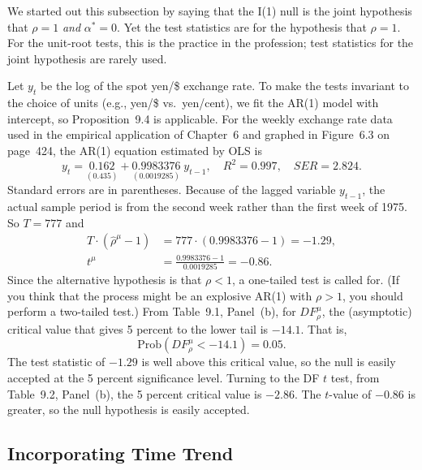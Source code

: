 We started out this subsection by saying that the I(1) null is the joint hypothesis
that $\rho = 1$ \emph{and} $\alpha^* = 0$. Yet the test statistics are for the hypothesis that $\rho = 1$. For
the unit-root tests, this is the practice in the profession; test statistics for the joint
hypothesis are rarely used.

\begin{example}
\label{ex:9.1}
Let $y_t$ be the
log of the spot yen/\$ exchange rate. To make the tests invariant to the choice
of units (e.g., yen/\$ vs.\ yen/cent), we fit the AR(1) model with intercept, so
Proposition~9.4 is applicable. For the weekly exchange rate data used in the
empirical application of Chapter~6 and graphed in Figure~6.3 on page~424,
the AR(1) equation estimated by OLS is
\[
y_t = \underset{(0.435)}{0.162} + \underset{(0.0019285)}{0.9983376}\; y_{t-1},
\quad R^2 = 0.997, \quad SER = 2.824.
\]
Standard errors are in parentheses. Because of the lagged variable $y_{t-1}$, the
actual sample period is from the second week rather than the first week of
1975. So $T = 777$ and
\begin{align*}
T \cdot (\hat{\rho}^\mu - 1) &= 777 \cdot (0.9983376 - 1) = -1.29, \\
t^\mu &= \frac{0.9983376 - 1}{0.0019285} = -0.86.
\end{align*}
Since the alternative hypothesis is that $\rho < 1$, a one-tailed test is called for.
(If you think that the process might be an explosive AR(1) with $\rho > 1$, you
should perform a two-tailed test.) From Table~9.1, Panel~(b), for $DF_\rho^\mu$, the
(asymptotic) critical value that gives 5 percent to the lower tail is $-14.1$.
That is,
\[
\text{Prob}(DF_\rho^\mu < -14.1) = 0.05.
\]
The test statistic of $-1.29$ is well above this critical value, so the null is
easily accepted at the 5 percent significance level. Turning to the DF $t$ test,
from Table~9.2, Panel~(b), the 5 percent critical value is $-2.86$. The $t$-value
of $-0.86$ is greater, so the null hypothesis is easily accepted.
\end{example}

\subsection*{Incorporating Time Trend}

